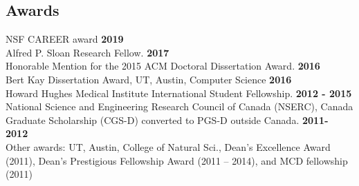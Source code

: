\documentclass[margin,line,letterpaper]{resume}
\begin{document}
\begin{resume}
    \section{\mysidestyle Awards}
    NSF CAREER award \hfill \textbf{ 2019}\vspace{1mm}\\
    Alfred P. Sloan Research Fellow.\hfill \textbf{ 2017}\vspace{1mm}\\
    Honorable Mention for the 2015 ACM Doctoral Dissertation Award.\hfill \textbf{ 2016}\vspace{1mm}\\
     Bert Kay Dissertation Award, UT,  Austin, Computer Science\hfill \textbf{ 2016}\vspace{1mm}\\
     Howard Hughes Medical Institute International Student Fellowship. \hfill \textbf{2012 - 2015}\vspace{1mm}\\
     National Science and Engineering Research Council of Canada (NSERC), 
      Canada Graduate Scholarship (CGS-D) converted to PGS-D outside Canada. \hfill \textbf{2011- 2012} \\
     Other awards: UT,  Austin, College of Natural Sci., Dean's Excellence Award (2011), Dean's Prestigious Fellowship Award (2011 --  2014), and MCD fellowship (2011) %
    
    
    

\end{resume}
\end{document}
